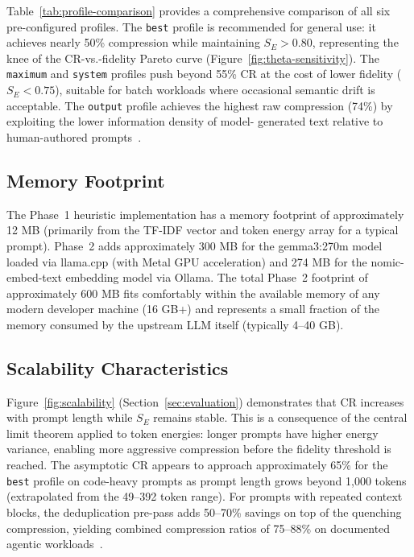 \documentclass[11pt]{article}
\theoremstyle{remark}
\begin{document}
Table~\ref{tab:profile-comparison} provides a comprehensive comparison of
all six pre-configured profiles. The \texttt{best} profile is recommended
for general use: it achieves nearly 50\% compression while maintaining
$S_E > 0.80$, representing the knee of the CR-vs.-fidelity Pareto curve
(Figure~\ref{fig:theta-sensitivity}). The \texttt{maximum} and
\texttt{system} profiles push beyond 55\% CR at the cost of lower fidelity
($S_E < 0.75$), suitable for batch workloads where occasional semantic
drift is acceptable. The \texttt{output} profile achieves the highest raw
compression (74\%) by exploiting the lower information density of model-
generated text relative to human-authored prompts~\cite{caveman2026}.

\subsection{Memory Footprint}

The Phase~1 heuristic implementation has a memory footprint of approximately
12 MB (primarily from the TF-IDF vector and token energy array for a typical
prompt). Phase~2 adds approximately 300 MB for the gemma3:270m model loaded
via llama.cpp (with Metal GPU acceleration) and 274 MB for the
nomic-embed-text embedding model via Ollama. The total Phase~2 footprint
of approximately 600 MB fits comfortably within the available memory of any
modern developer machine (16 GB+) and represents a small fraction of the
memory consumed by the upstream LLM itself (typically 4--40 GB).

\subsection{Scalability Characteristics}

Figure~\ref{fig:scalability} (Section~\ref{sec:evaluation}) demonstrates
that CR increases with prompt length while $S_E$ remains stable. This is
a consequence of the central limit theorem applied to token energies:
longer prompts have higher energy variance, enabling more aggressive
compression before the fidelity threshold is reached. The asymptotic CR
appears to approach approximately 65\% for the \texttt{best} profile on
code-heavy prompts as prompt length grows beyond 1,000 tokens
(extrapolated from the 49--392 token range). For prompts with repeated
context blocks, the deduplication pre-pass adds 50--70\% savings on top
of the quenching compression, yielding combined compression ratios of
75--88\% on documented agentic workloads~\cite{rosati2026}.
\end{document}

